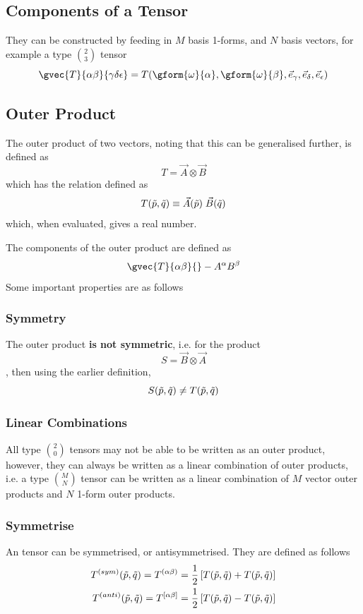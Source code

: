 \subsection{Components of a Tensor}
They can be constructed by feeding in $M$ basis 1-forms, and $N$ basis vectors, for example a type $\binom{2}{3}$ tensor
$$ \gvec{T}{\alpha \beta}{\gamma \delta \epsilon} = T(\gform{\omega}{\alpha}, \gform{\omega}{\beta}, \vec{e}_\gamma, \vec{e}_\delta, \vec{e}_\epsilon) $$

\subsection{Outer Product}
The outer product of two vectors, noting that this can be generalised further, is defined as
$$ T = \vec{A} \otimes \vec{B} $$
which has the relation defined as
$$ T(\Tilde{p}, \Tilde{q}) \equiv \vec{A}(\Tilde{p}) \; \vec{B}(\Tilde{q}) $$
which, when evaluated, gives a real number.
\par The components of the outer product are defined as
$$ \gvec{T}{\alpha \beta}{} - A^\alpha B^\beta $$
Some important properties are as follows
\subsubsection{Symmetry}
The outer product \textbf{is not symmetric}, i.e. for the product 
$$ S = \vec{B} \otimes \vec{A} $$, then using the earlier definition,
$$ S(\Tilde{p}, \Tilde{q}) \neq T(\Tilde{p}, \Tilde{q}) $$

\subsubsection{Linear Combinations}
All type $\binom{2}{0}$ tensors may not be able to be written as an outer product, however, they can always be written as a linear combination of outer products, i.e. a type $\binom{M}{N}$ tensor can be written as a linear combination of $M$ vector outer products and $N$ 1-form outer products.

\subsubsection{Symmetrise}
An tensor can be symmetrised, or antisymmetrised. They are defined as follows
\begin{align*}
    T^{(sym)}(\Tilde{p}, \Tilde{q}) = T^{(\alpha \beta)} & = \frac{1}{2}\left[T(\Tilde{p}, \Tilde{q}) + T(\Tilde{p}, \Tilde{q})\right] \\
    T^{(anti)}(\Tilde{p}, \Tilde{q}) = T^{[\alpha \beta]} & = \frac{1}{2}\left[T(\Tilde{p}, \Tilde{q}) - T(\Tilde{p}, \Tilde{q})\right]
\end{align*}
\newpage
